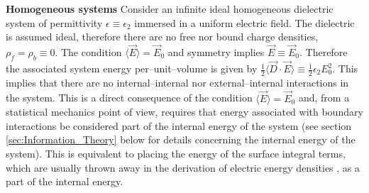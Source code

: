 \documentclass[english,12pt]{ttuthes}
\begin{document}
\noindent\textbf{Homogeneous systems}\newline
%
Consider an infinite ideal homogeneous dielectric system of
permittivity $\epsilon\equiv\epsilon_2$ immersed in a uniform electric field. The
dielectric is assumed ideal, therefore there 
are no free nor bound charge densities, $\rho_f=\rho_b\equiv0$. The condition
$\langle\vec{E}\rangle=\vec{E}_0$ and symmetry implies
$\vec{E}\equiv\vec{E}_0$. Therefore the associated system energy
per--unit--volume is given by 
$\frac{1}{2}\langle\vec{D}\cdot\vec{E}\rangle\equiv\frac{1}{2}\epsilon_2E_0^2$. This implies that
there are no internal--internal nor external--internal interactions in
the system. This is a direct consequence of the condition
$\langle\vec{E}\rangle=\vec{E}_0$ and, from a statistical mechanics point of view,
requires that energy associated with boundary interactions be
considered part of the internal energy of the system (see section
\ref{sec:Information_Theory} below for details concerning the internal
energy of the system). This is equivalent to placing the energy of the
surface integral terms, which are usually thrown away in the
derivation of electric energy densities \cite{Griffiths-1999}, as a
part of the internal energy.     
\end{document}
